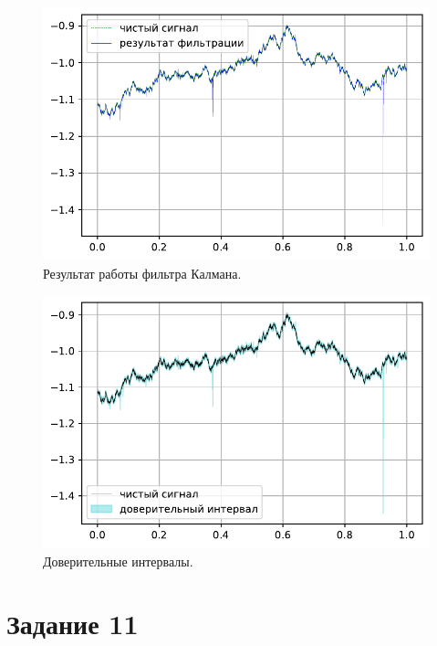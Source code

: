 \documentclass[16pt]{article}
\begin{document}
\begin{figure}
	\center
	\includegraphics[scale=0.7]{10_5.pdf}
	\caption{Результат работы фильтра Калмана.}
\end{figure}

\begin{figure}
	\center
	\includegraphics[scale=0.7]{10_6.pdf}
	\caption{Доверительные интервалы.}
\end{figure}


\section{Задание 11}
\end{document}

